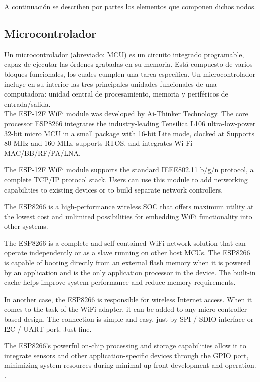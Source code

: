 A continuación se describen por partes los elementos que componen dichos nodos.


\subsection{Microcontrolador} \label{sec: microcontrolador}

    Un microcontrolador (abreviado: MCU) es un circuito integrado programable, capaz de ejecutar las órdenes grabadas en su memoria. Está compuesto de varios bloques funcionales, los cuales cumplen una tarea específica. Un microcontrolador incluye en su interior las tres principales unidades funcionales de una computadora: unidad central de procesamiento, memoria y periféricos de entrada/salida.\\

The ESP-12F WiFi module was developed by Ai-Thinker Technology. The core processor
ESP8266 integrates the industry-leading Tensilica L106 ultra-low-power 32-bit micro MCU in
a small package with 16-bit Lite mode, clocked at Supports 80 MHz and 160 MHz, supports
RTOS, and integrates Wi-Fi MAC/BB/RF/PA/LNA.

The ESP-12F WiFi module supports the standard IEEE802.11 b/g/n protocol, a complete
TCP/IP protocol stack. Users can use this module to add networking capabilities to existing
devices or to build separate network controllers.

The ESP8266 is a high-performance wireless SOC that offers maximum utility at the lowest
cost and unlimited possibilities for embedding WiFi functionality into other systems.

The ESP8266 is a complete and self-contained WiFi network solution that can operate
independently or as a slave running on other host MCUs. The ESP8266 is capable of booting
directly from an external flash memory when it is powered by an application and is the only
application processor in the device. The built-in cache helps improve system performance and
reduce memory requirements.

In another case, the ESP8266 is responsible for wireless Internet access. When it comes to
the task of the WiFi adapter, it can be added to any micro controller-based design. The connection
is simple and easy, just by SPI / SDIO interface or I2C / UART port. Just fine.

The ESP8266's powerful on-chip processing and storage capabilities allow it to integrate
sensors and other application-specific devices through the GPIO port, minimizing system
resources during minimal up-front development and operation. \cite{esp12}.\\

